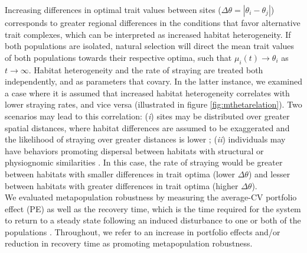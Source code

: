 \documentclass{revtex4}
\begin{document}
\noindent Increasing differences in optimal trait values between sites ($\Delta\theta = \left|\theta_i - \theta_j\right|$) corresponds to greater regional differences in the conditions that favor alternative trait complexes, which can be interpreted as increased habitat heterogeneity.
If both populations are isolated, natural selection will direct the mean trait values of both populations towards their respective optima, such that $\mu_i(t) \rightarrow \theta_i$ as $t\rightarrow\infty$.
Habitat heterogeneity and the rate of straying are treated both independently, and as parameters that covary.
In the latter instance, we examined a case where it is assumed that increased habitat heterogeneity correlates with lower straying rates, and vice versa (illustrated in figure \ref{fig:mthetarelation}).
Two scenarios may lead to this correlation: 
(\emph{i}) sites may be distributed over greater spatial distances, where habitat differences are assumed to be exaggerated and the likelihood of straying over greater distances is lower \citep{Candy:2000hu,JPE:JPE1383};
(\emph{ii}) individuals may have behaviors promoting dispersal between habitats with structural or physiognomic similarities \citep{Peterson:2014gy}.
In this case, the rate of straying would be greater between habitats with smaller differences in trait optima (lower $\Delta\theta$) and lesser between habitats with greater differences in trait optima (higher $\Delta\theta$).
\\


\noindent We evaluated metapopulation robustness by measuring the average-CV portfolio effect (PE) \citep{Anderson:2014cx,Schindler:2015gf} as well as the recovery time, which is the time required for the system to return to a steady state following an induced disturbance to one or both of the populations \citep{Ovaskainen:2002il}.
Throughout, we refer to an increase in portfolio effects and/or reduction in recovery time as promoting metapopulation robustness.
\end{document}
